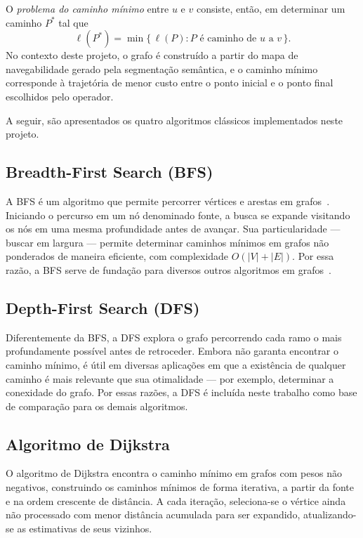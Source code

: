 \documentclass[
    12pt,
    openright,
    oneside,
    a4paper,
    english,
    brazil
]{abntex2}
\begin{document}
O \emph{problema do caminho mínimo} entre $u$ e $v$ consiste, então, em determinar um caminho $P^\ast$ tal que
\[
\ell(P^\ast) = \min \{\, \ell(P) : P \text{ é caminho de } u \text{ a } v \,\}.
\]
No contexto deste projeto, o grafo é construído a partir do mapa de navegabilidade gerado pela segmentação semântica, e o caminho mínimo corresponde à trajetória de menor custo entre o ponto inicial e o ponto final escolhidos pelo operador.

A seguir, são apresentados os quatro algoritmos clássicos implementados neste projeto.

\subsection{Breadth-First Search (BFS)}

A BFS é um algoritmo que permite percorrer vértices e arestas em grafos~\cite{cormen2009, moore1959}. Iniciando o percurso em um nó denominado fonte, a busca se expande visitando os nós em uma mesma profundidade antes de avançar. Sua particularidade --- buscar em largura --- permite determinar caminhos mínimos em grafos não ponderados de maneira eficiente, com complexidade $O(|V| + |E|)$. Por essa razão, a BFS serve de fundação para diversos outros algoritmos em grafos~\cite{beamer2013}.

\subsection{Depth-First Search (DFS)}

Diferentemente da BFS, a DFS \cite{cormen2009} explora o grafo percorrendo cada ramo o mais profundamente possível antes de retroceder. Embora não garanta encontrar o caminho mínimo, é útil em diversas aplicações em que a existência de qualquer caminho é mais relevante que sua otimalidade --- por exemplo, determinar a conexidade do grafo. Por essas razões, a DFS é incluída neste trabalho como base de comparação para os demais algoritmos.

\subsection{Algoritmo de Dijkstra}

O algoritmo de Dijkstra \cite{dijkstra1959} encontra o caminho mínimo em grafos com pesos não negativos, construindo os caminhos mínimos de forma iterativa, a partir da fonte e na ordem crescente de distância. A cada iteração, seleciona-se o vértice ainda não processado com menor distância acumulada para ser expandido, atualizando-se as estimativas de seus vizinhos.
\end{document}

